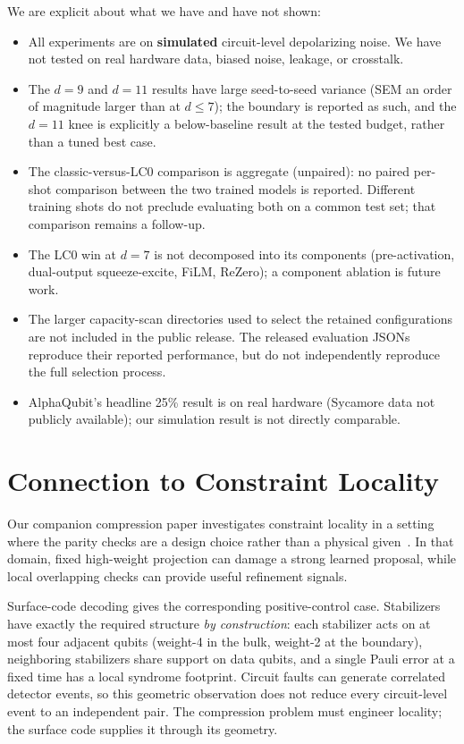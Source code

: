 \documentclass[11pt,a4paper]{article}
\begin{document}
We are explicit about what we have and have not shown:
\begin{itemize}[nosep]
  \item All experiments are on \textbf{simulated} circuit-level
        depolarizing noise. We have not tested on real hardware data,
        biased noise, leakage, or crosstalk.
  \item The $d=9$ and $d=11$ results have large seed-to-seed variance
        (SEM an order of magnitude larger than at $d\le7$); the boundary
        is reported as such, and the $d=11$ knee is explicitly
        a below-baseline result at the tested budget, rather than a tuned best case.
  \item The classic-versus-LC0 comparison is aggregate (unpaired): no
        paired per-shot comparison between the two trained models is
        reported. Different training shots do not preclude evaluating
        both on a common test set; that comparison remains a follow-up.
  \item The LC0 win at $d=7$ is not decomposed into its components
        (pre-activation, dual-output squeeze-excite, FiLM, ReZero); a
        component ablation is future work.
  \item The larger capacity-scan directories used to select the retained
        configurations are not included in the public release. The
        released evaluation JSONs reproduce their reported performance,
        but do not independently reproduce the full selection process.
  \item AlphaQubit's headline 25\% result is on real hardware (Sycamore
        data not publicly available); our simulation result is not
        directly comparable.
\end{itemize}

\section{Connection to Constraint Locality}

Our companion compression paper investigates constraint locality in
a setting where the parity checks are a design choice rather than a physical
given~\cite{guarraci2026compression}. In that domain, fixed high-weight
projection can damage a strong learned proposal, while local overlapping
checks can provide useful refinement signals.

Surface-code decoding gives the corresponding positive-control case.
Stabilizers have exactly the required structure \emph{by construction}: each
stabilizer acts on at most four adjacent qubits (weight-4 in the bulk,
weight-2 at the boundary), neighboring stabilizers share support on data
qubits, and a single Pauli error at a fixed time has a local syndrome footprint.
Circuit faults can generate correlated detector events, so this geometric
observation does not reduce every circuit-level event to an independent
pair. The
compression problem must engineer locality; the surface code supplies it
through its geometry.
\end{document}
